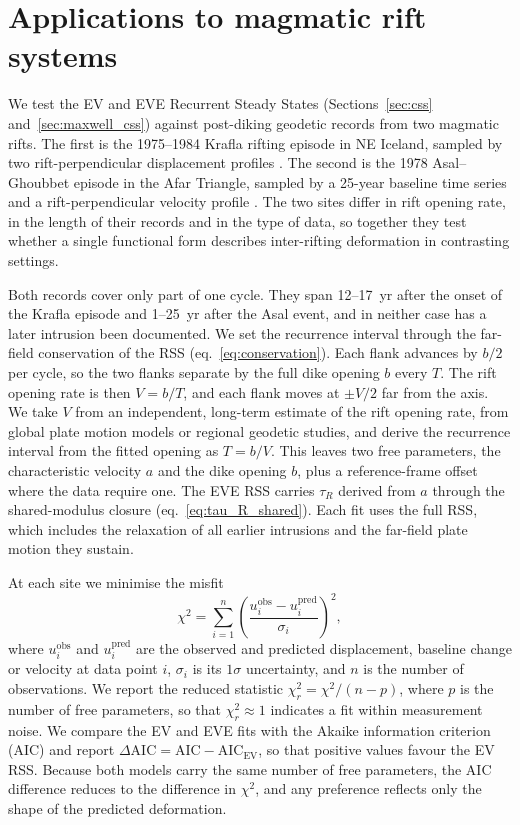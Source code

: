 \documentclass[extra]{gji}
\begin{document}
\section{Applications to magmatic rift systems}
\label{sec:results}

We test the EV and EVE Recurrent Steady States
(Sections~\ref{sec:css} and~\ref{sec:maxwell_css}) against post-diking
geodetic records from two magmatic rifts. The first is the 1975--1984
Krafla rifting episode in NE Iceland, sampled by two rift-perpendicular
displacement profiles \citep{foulger1992post,hofton1996post}. The second
is the 1978 Asal--Ghoubbet episode in the Afar Triangle, sampled by a
25-year baseline time series and a rift-perpendicular velocity profile
\citep{vigny2007twenty}. The two sites differ in rift opening rate, in the
length of their records and in the type of data, so together they test
whether a single functional form describes inter-rifting deformation in
contrasting settings.

Both records cover only part of one cycle. They span 12--17~yr after the
onset of the Krafla episode and 1--25~yr after the Asal event, and in
neither case has a later intrusion been documented. We set the recurrence
interval through the far-field conservation of the RSS
(eq.~\ref{eq:conservation}). Each flank advances by $b/2$ per cycle,
so the two flanks separate by the full dike opening $b$ every $T$. The
rift opening rate is then $V = b/T$, and each flank moves at $\pm V/2$ far
from the axis. We take
$V$ from an independent, long-term estimate of the rift opening rate, from
global plate motion models or regional geodetic studies, and derive the
recurrence interval from the fitted opening as $T = b/V$.
This leaves two free parameters, the characteristic velocity $a$ and the
dike opening $b$, plus a reference-frame offset where the data require
one. The EVE RSS carries $\tau_R$ derived from $a$ through the
shared-modulus closure (eq.~\ref{eq:tau_R_shared}). Each fit uses the
full RSS, which includes the relaxation of all earlier intrusions and the
far-field plate motion they sustain.

At each site we minimise the misfit
\begin{equation}
\chi^2 = \sum_{i=1}^{n}
  \left(\frac{u_i^{\mathrm{obs}} - u_i^{\mathrm{pred}}}{\sigma_i}\right)^2,
\label{eq:chi2}
\end{equation}
where $u_i^{\mathrm{obs}}$ and $u_i^{\mathrm{pred}}$ are the observed and
predicted displacement, baseline change or velocity at data point $i$,
$\sigma_i$ is its $1\sigma$ uncertainty, and $n$ is the number of
observations. We report the reduced statistic $\chi^2_r = \chi^2/(n-p)$,
where $p$ is the number of free parameters, so that $\chi^2_r \approx 1$
indicates a fit within measurement noise. We compare the EV and EVE fits
with the Akaike information criterion (AIC) and report
$\Delta\mathrm{AIC} = \mathrm{AIC} - \mathrm{AIC}_{\mathrm{EV}}$, so that
positive values favour the EV RSS. Because both models carry
the same number of free parameters, the AIC difference reduces to the
difference in $\chi^2$, and any preference reflects only the shape of the
predicted deformation.
\end{document}

